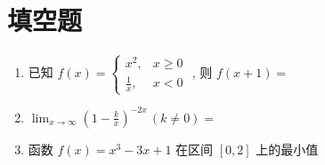\documentclass[twocolumn,UTF8]{ctexart}
\begin{document}
\section{填空题}
 \begin{enumerate}
\item 已知 $f(x)=\begin{cases}x^2,&x\geq 0\\\frac{1}{x},&x<0\end{cases}$ , 则 $f(x+1)=$ \underline{\hspace{2.5cm}}\\[1mm]
\item $ \lim_{x\to\infty}\left(1-\frac{k}{x}\right)^{-2x} \,(k\neq0)=$ \underline{\hspace{2.5cm}}\\[-0.3cm]
\item 函数 $f(x)=x^3-3x+1$ 在区间 $[0,2]$ 上的最小值  \underline{\hspace{2.5cm}}\\[-0.6cm]
\end{enumerate}
\end{document}
